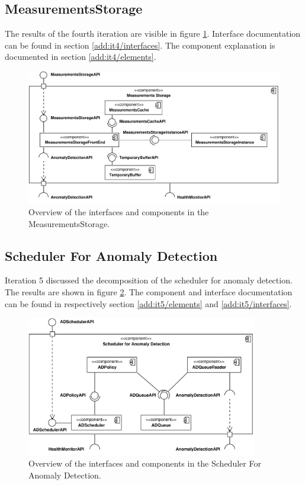 \subsection{MeasurementsStorage}

\npar The results of the fourth iteration are visible in figure
\ref{fig:final-architecture/it4}. Interface documentation can be found in
section \ref{add:it4/interfaces}. The component explanation is documented in
section \ref{add:it4/elements}.

\begin{figure}
	\begin{centering}
		\includegraphics[width=\textwidth]{figs/add-it4-interfaces.pdf}
		\caption{Overview of the interfaces and components in the
		MeasurementsStorage.}
		\label{fig:final-architecture/it4}
	\end{centering}
\end{figure}

\subsection{Scheduler For Anomaly Detection}

\npar Iteration 5 discussed the decomposition of the scheduler for anomaly
detection. The results are shown in figure \ref{fig:final-architecture/it5}. The
component and interface documentation can be found in respectively section
\ref{add:it5/elements} and \ref{add:it5/interfaces}.

\begin{figure}
	\begin{centering}
		\includegraphics[width=0.9\textwidth]{figs/add-it5-interfaces.pdf}
		\caption{Overview of the interfaces and components in the Scheduler For
		Anomaly Detection.}
		\label{fig:final-architecture/it5}
	\end{centering}
\end{figure}

